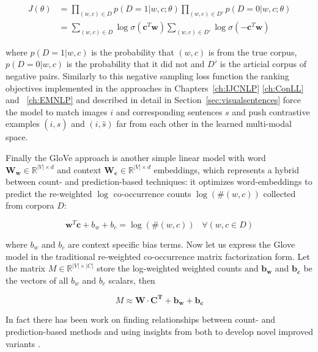 \begin{align}
J(\theta) &= \prod_{(w,c) \in D} p(D=1|w,c;\theta)  \prod_{(w,c) \in D'}  p(D=0|w,c;\theta) \\
&= \sum_{(w,c) \in D} \log  \sigma(\mathbf{c}^T\mathbf{w}) \sum_{(w,c) \in D'}  \log \sigma(-\mathbf{c}^T\mathbf{w})
\end{align}

where  $p(D=1|w,c)$ is the probability that $(w,c)$ is from the true corpus, $p(D=0|w,c)$ is the
probability that it did not and $D'$ is the articial corpus of negative pairs.
Similarly to this negative sampling loss function the ranking objectives 
implemented in the approaches in Chapters~\ref{ch:IJCNLP} \ref{ch:ConLL} and ~\ref{ch:EMNLP}
and described in detail in Section~\ref{sec:visualsentences} force the model
to match images $i$ and corresponding sentences $s$ and push contrastive examples $(\hat{i},s)$ 
and $(i,\hat{s})$ far from each other in the learned multi-modal space.

Finally the GloVe approach \citep{pennington2014glove} is another simple linear model
with word $\mathbf{W_w}  \in \mathbb{R}^{|V| \times d}$ and context
$\mathbf{W_c} \in \mathbb{R}^{|V| \times d}$ embeddings, which
represents a hybrid between count- and prediction-based techniques:
it optimizes word-embeddings to predict the re-weighted
$\log$ co-occurrence counts $\log(\#(w,c))$ collected from corpora $D$:

\begin{equation}
\label{eq:glove}
\mathbf{w}^T\mathbf{c} + b_w + b_c = \log(\#(w,c))\;\;\; \forall (w,c \in D)
\end{equation}

where $b_w$ and $b_c$ are context specific bias terms.
Now let us express the Glove model in the traditional re-weighted
co-occurrence matrix factorization form.
Let the matrix $M \in \mathbb{R}^{|V| \times |C|}$ store the log-weighted
weighted counts and $\mathbf{b_w}$ and $\mathbf{b_c}$ be the vectors of all
$b_w$ and $b_c$ scalars, then

\begin{equation}
\label{eq:glove2}
M \approx \mathbf{W} \cdot \mathbf{C^T} + \mathbf{b_w} + \mathbf{b_c}
\end{equation}

In fact there has been work on finding relationships between
count- and prediction-based methods \citep{levy2014neural} and
using insights from both to develop novel improved
variants \citep{levy2015improving}.

